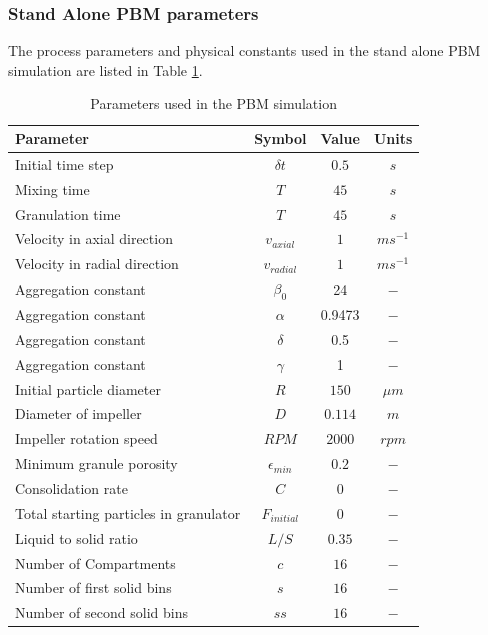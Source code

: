 \subsubsection{Stand Alone PBM parameters}
The process parameters and physical constants used in the stand alone PBM simulation are listed in Table \ref{table:mthds_pbm_sa_parameters}.

\begin{table}[H]
\caption{Parameters used in the PBM simulation}
\label{table:mthds_pbm_sa_parameters}
\begin{center}
\begin{tabular}{l|c|c|c}
\hline
\bf{Parameter} &\bf{Symbol} &\bf{Value} &\bf{Units}\\
\hline
Initial time step & $\delta t$ & $0.5$ & $s$\\
Mixing time & $T$ & $45$ & $s$\\
Granulation time & $T$ & $45$ & $s$\\
Velocity in axial direction & $v_{axial}$ & $1$ & $ms^{-1}$\\
Velocity in radial direction & $v_{radial}$ & $1$ & $ms^{-1}$\\
Aggregation constant & $\beta_0$ & 24 & $-$\\
Aggregation constant & $\alpha$ & 0.9473 & $-$\\
Aggregation constant & $\delta$ & 0.5 & $-$\\
Aggregation constant & $\gamma$ & 1 & $-$\\
Initial particle diameter & $R$ & $150$ & $\mu m$\\
Diameter of impeller & $D$ & $0.114$ & $m$ \\
Impeller rotation speed & $RPM$ & $2000$ & $rpm$\\
Minimum granule porosity & $\epsilon_{min}$ & $0.2$ & $-$\\
Consolidation rate & $C$ & $0$ & $-$\\
Total starting particles in granulator & $F_{initial}$ & 0 & $-$\\
Liquid to solid ratio & $L/S$ & $0.35$ & $-$ \\
Number of Compartments & $c$ & $16$ & $-$ \\
Number of first solid bins & $s$ & $16$ & $-$\\
Number of second solid bins & $ss$ & $16$ & $-$\\
\hline
\end{tabular}
\end{center}
\end{table}



